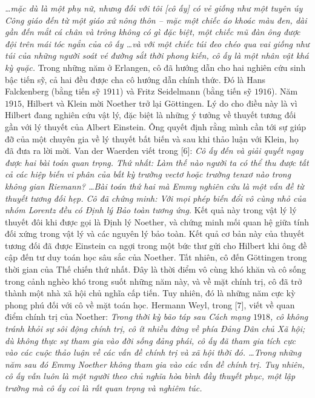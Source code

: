 \begin{multicols}{2}
	\vskip 0.05cm
	\textit{\ldots mặc dù là một phụ nữ, nhưng đối với tôi [cô ấy] có vẻ giống như một tuyên úy Công giáo đến từ một giáo xứ nông thôn -- mặc một chiếc áo khoác màu đen, dài gần đến mắt cá chân và trông không có gì đặc biệt, một chiếc mũ đàn ông được đội trên mái tóc ngắn của cô ấy \ldots và với một chiếc túi đeo chéo qua vai giống như túi của những người soát vé đường sắt thời phong kiến, cô ấy là một nhân vật khá kỳ quặc.}
	\vskip 0.05cm
	Trong những năm ở Erlangen, cô đã hướng dẫn cho hai nghiên cứu sinh bậc tiến sỹ, cả hai đều được cha cô hướng dẫn chính thức. Đó là Hans Falckenberg (bằng tiến sỹ $1911$) và Fritz Seidelmann (bằng tiến sỹ $1916$).
	\vskip 0.05cm
	Năm $1915$, Hilbert và Klein mời Noether trở lại Göttingen. Lý do cho điều này là vì Hilbert đang nghiên cứu vật lý, đặc biệt là những ý tưởng về thuyết tương đối gần với lý thuyết của Albert Einstein. Ông quyết định rằng mình cần tới sự giúp đỡ của một chuyên gia về lý thuyết bất biến và sau khi thảo luận với Klein, họ đã đưa ra lời mời. Van der Waerden viết trong [$6$]:
	\vskip 0.05cm
	\textit{Cô ấy đến và giải quyết ngay được hai bài toán quan trọng. Thứ nhất: Làm thế nào người ta có thể thu được tất cả các hiệp biến vi phân của bất kỳ trường vectơ hoặc trường tenxơ nào trong không gian Riemann? \ldots Bài toán thứ hai mà Emmy nghiên cứu là một vấn đề từ thuyết tương đối hẹp. Cô đã chứng minh: Với mọi phép biến đổi vô cùng nhỏ của nhóm Lorentz đều có Định lý Bảo toàn tương ứng.}
	\vskip 0.05cm
	Kết quả này trong vật lý lý thuyết đôi khi được gọi là Định lý Noether, và chứng minh mối quan hệ giữa tính đối xứng trong vật lý và các nguyên lý bảo toàn. Kết quả cơ bản này của thuyết tương đối đã được Einstein ca ngợi trong một bức thư gửi cho Hilbert khi ông đề cập đến tư duy toán học sâu sắc của Noether. Tất nhiên, cô  đến Göttingen trong thời gian của Thế chiến thứ nhất. Đây là thời điểm vô cùng khó khăn và cô  sống trong cảnh nghèo khó trong suốt những năm này, và về mặt chính trị, cô  đã trở thành một nhà xã hội chủ nghĩa cấp tiến. Tuy nhiên, đó là những năm cực kỳ phong phú đối với cô về mặt toán học. Hermann Weyl, trong [$7$], viết về quan điểm chính trị của Noether:
	\vskip 0.05cm
	\textit{Trong thời kỳ bão táp sau Cách mạng $1918$, cô không tránh khỏi sự sôi động chính trị, cô ít nhiều đứng về phía Đảng Dân chủ Xã hội; dù không thực sự tham gia vào đời sống đảng phái, cô ấy đã tham gia tích cực vào các cuộc thảo luận về các vấn đề chính trị và xã hội thời đó. \ldots Trong những năm sau đó Emmy Noether không tham gia vào các vấn đề chính trị. Tuy nhiên, cô ấy vẫn luôn là một người theo chủ nghĩa hòa bình đầy thuyết phục, một lập trường mà cô ấy coi là rất quan trọng và nghiêm túc.}

\end{multicols}
